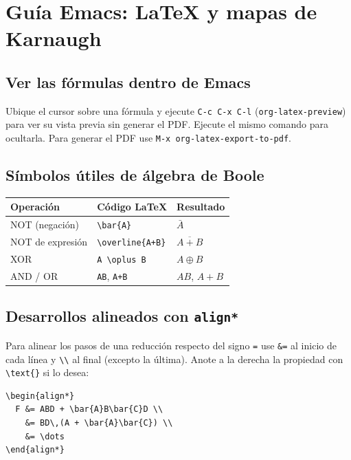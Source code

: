\documentclass[11pt]{article}
\begin{document}
\section{Guía Emacs: \LaTeX{} y mapas de Karnaugh}
\label{sec:orgf4b10b6}
\subsection{Ver las fórmulas dentro de Emacs}
\label{sec:org61240bf}
Ubique el cursor sobre una fórmula y ejecute \texttt{C-c C-x C-l}
(\texttt{org-latex-preview}) para ver su vista previa sin generar el PDF.
Ejecute el mismo comando para ocultarla. Para generar el PDF use
\texttt{M-x org-latex-export-to-pdf}.

\subsection{Símbolos útiles de álgebra de Boole}
\label{sec:org6a1c484}
\begin{center}
\begin{tabular}{lll}
Operación & Código \LaTeX{} & Resultado\\[0pt]
\hline
NOT (negación) & \texttt{\textbackslash{}bar\{A\}} & \(\bar{A}\)\\[0pt]
NOT de expresión & \texttt{\textbackslash{}overline\{A+B\}} & \(\overline{A+B}\)\\[0pt]
XOR & \texttt{A \textbackslash{}oplus B} & \(A \oplus B\)\\[0pt]
AND / OR & \texttt{AB}, \texttt{A+B} & \(AB\), \(A+B\)\\[0pt]
\end{tabular}
\end{center}

\subsection{Desarrollos alineados con \texttt{align*}}
\label{sec:org978b86a}
Para alinear los pasos de una reducción respecto del signo \texttt{=} use \texttt{\&=}
al inicio de cada línea y \texttt{\textbackslash{}\textbackslash{}} al final (excepto la última). Anote a la
derecha la propiedad con \texttt{\textbackslash{}text\{\}} si lo desea:

\begin{verbatim}
\begin{align*}
  F &= ABD + \bar{A}B\bar{C}D \\
    &= BD\,(A + \bar{A}\bar{C}) \\
    &= \dots
\end{align*}
\end{verbatim}
\end{document}
